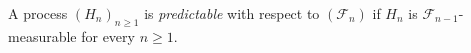 
A process $(H_n)_{n\ge1}$ is \emph{predictable} with respect to $(\mathcal F_n)$ if $H_n$ is $\mathcal F_{n-1}$-measurable for every $n\ge1$.

